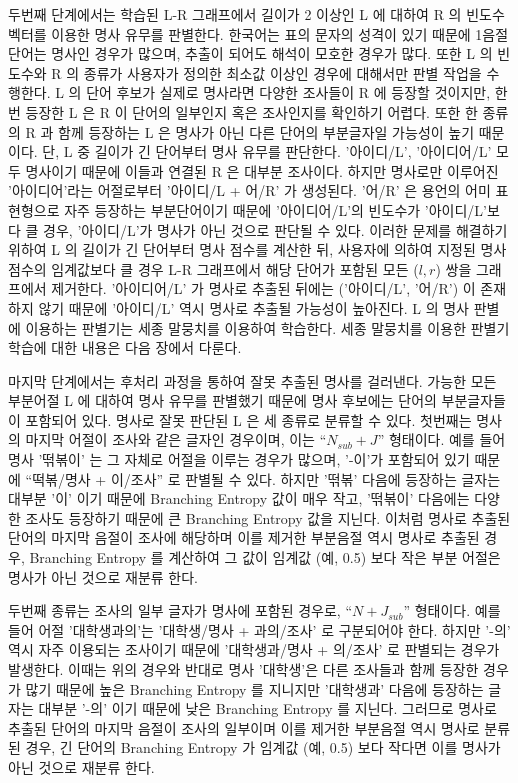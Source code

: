 \documentclass[oneside, ko,phd]{snuthesis_utf8_kor}
\begin{document}
두번째 단계에서는 학습된 L-R 그래프에서 길이가 2 이상인 L 에 대하여 R 의 빈도수 벡터를 이용한 명사 유무를 판별한다.
한국어는 표의 문자의 성격이 있기 때문에 1음절 단어는 명사인 경우가 많으며, 추출이 되어도 해석이 모호한 경우가 많다.
또한 L 의 빈도수와 R 의 종류가 사용자가 정의한 최소값 이상인 경우에 대해서만 판별 작업을 수행한다.
L 의 단어 후보가 실제로 명사라면 다양한 조사들이 R 에 등장할 것이지만, 한 번 등장한 L 은 R 이 단어의 일부인지 혹은 조사인지를 확인하기 어렵다.
또한 한 종류의 R 과 함께 등장하는 L 은 명사가 아닌 다른 단어의 부분글자일 가능성이 높기 때문이다.
단, L 중 길이가 긴 단어부터 명사 유무를 판단한다.
'아이디/L', '아이디어/L' 모두 명사이기 때문에 이들과 연결된 R 은 대부분 조사이다.
하지만 명사로만 이루어진 '아이디어'라는 어절로부터 '아이디/L + 어/R' 가 생성된다.
'어/R' 은 용언의 어미 표현형으로 자주 등장하는 부분단어이기 때문에 '아이디어/L'의 빈도수가 '아이디/L'보다 클 경우, '아이디/L'가 명사가 아닌 것으로 판단될 수 있다.
이러한 문제를 해결하기 위하여 L 의 길이가 긴 단어부터 명사 점수를 계산한 뒤, 사용자에 의하여 지정된 명사 점수의 임계값보다 클 경우 L-R 그래프에서 해당 단어가 포함된 모든 ($l, r$) 쌍을 그래프에서 제거한다.
'아이디어/L' 가 명사로 추출된 뒤에는 ('아이디/L', '어/R') 이 존재하지 않기 때문에 '아이디/L' 역시 명사로 추출될 가능성이 높아진다.
L 의 명사 판별에 이용하는 판별기는 세종 말뭉치를 이용하여 학습한다.
세종 말뭉치를 이용한 판별기 학습에 대한 내용은 다음 장에서 다룬다.

마지막 단계에서는 후처리 과정을 통하여 잘못 추출된 명사를 걸러낸다.
가능한 모든 부분어절 L 에 대하여 명사 유무를 판별했기 때문에 명사 후보에는 단어의 부분글자들이 포함되어 있다.
명사로 잘못 판단된 L 은 세 종류로 분류할 수 있다.
첫번째는 명사의 마지막 어절이 조사와 같은 글자인 경우이며, 이는 “$N_{sub} + J$” 형태이다.
예를 들어 명사 '떢볶이' 는 그 자체로 어절을 이루는 경우가 많으며, '-이'가 포함되어 있기 때문에 “떡볶/명사 + 이/조사” 로 판별될 수 있다.
하지만 '떢볶' 다음에 등장하는 글자는 대부분 '이' 이기 때문에 Branching Entropy 값이 매우 작고, '떢볶이' 다음에는 다양한 조사도 등장하기 때문에 큰 Branching Entropy 값을 지닌다.
이처럼 명사로 추출된 단어의 마지막 음절이 조사에 해당하며 이를 제거한 부분음절 역시 명사로 추출된 경우, Branching Entropy 를 계산하여 그 값이 임계값 (예, 0.5) 보다 작은 부분 어절은 명사가 아닌 것으로 재분류 한다.

두번째 종류는 조사의 일부 글자가 명사에 포함된 경우로, “$N + J_{sub}$” 형태이다.
예를 들어 어절 '대학생과의'는 '대학생/명사 + 과의/조사' 로 구분되어야 한다.
하지만 '-의' 역시 자주 이용되는 조사이기 때문에 '대학생과/명사 + 의/조사' 로 판별되는 경우가 발생한다.
이때는 위의 경우와 반대로 명사 '대학생'은 다른 조사들과 함께 등장한 경우가 많기 때문에 높은 Branching Entropy 를 지니지만 '대학생과' 다음에 등장하는 글자는 대부분 '-의' 이기 때문에 낮은 Branching Entropy 를 지닌다.
그러므로 명사로 추출된 단어의 마지막 음절이 조사의 일부이며 이를 제거한 부분음절 역시 명사로 분류된 경우, 긴 단어의 Branching Entropy 가 임계값 (예, 0.5) 보다 작다면 이를 명사가 아닌 것으로 재분류 한다.
\end{document}
